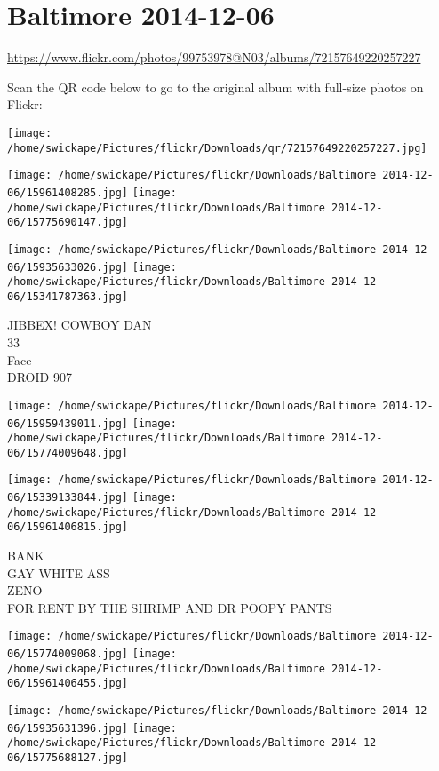 \documentclass[10pt,letterpaper]{article}
\begin{document}
\section*{Baltimore 2014-12-06}

\url{https://www.flickr.com/photos/99753978@N03/albums/72157649220257227}

Scan the QR code below to go to the original album with full-size photos on Flickr:

\texttt{[image: /home/swickape/Pictures/flickr/Downloads/qr/72157649220257227.jpg]}
\pagebreak

\texttt{[image: /home/swickape/Pictures/flickr/Downloads/Baltimore 2014-12-06/15961408285.jpg]}
\texttt{[image: /home/swickape/Pictures/flickr/Downloads/Baltimore 2014-12-06/15775690147.jpg]}

\texttt{[image: /home/swickape/Pictures/flickr/Downloads/Baltimore 2014-12-06/15935633026.jpg]}
\texttt{[image: /home/swickape/Pictures/flickr/Downloads/Baltimore 2014-12-06/15341787363.jpg]}

JIBBEX! COWBOY DAN\\
33\\
Face\\
DROID 907
\pagebreak

\texttt{[image: /home/swickape/Pictures/flickr/Downloads/Baltimore 2014-12-06/15959439011.jpg]}
\texttt{[image: /home/swickape/Pictures/flickr/Downloads/Baltimore 2014-12-06/15774009648.jpg]}

\texttt{[image: /home/swickape/Pictures/flickr/Downloads/Baltimore 2014-12-06/15339133844.jpg]}
\texttt{[image: /home/swickape/Pictures/flickr/Downloads/Baltimore 2014-12-06/15961406815.jpg]}

BANK\\
GAY WHITE ASS\\
ZENO\\
FOR RENT BY THE SHRIMP AND DR POOPY PANTS
\pagebreak

\texttt{[image: /home/swickape/Pictures/flickr/Downloads/Baltimore 2014-12-06/15774009068.jpg]}
\texttt{[image: /home/swickape/Pictures/flickr/Downloads/Baltimore 2014-12-06/15961406455.jpg]}

\texttt{[image: /home/swickape/Pictures/flickr/Downloads/Baltimore 2014-12-06/15935631396.jpg]}
\texttt{[image: /home/swickape/Pictures/flickr/Downloads/Baltimore 2014-12-06/15775688127.jpg]}
\end{document}
